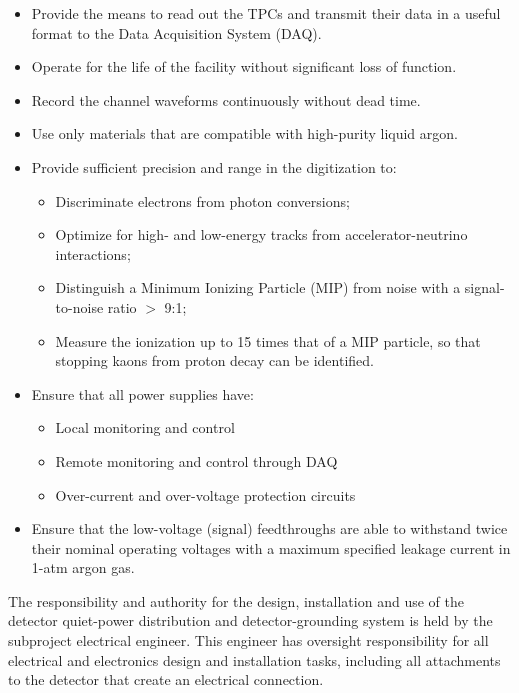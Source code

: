 \begin{itemize}	
\item Provide the means to read out the TPCs and transmit their data in a useful format to the Data Acquisition System (DAQ).
\item Operate for the life of the facility without significant loss of function.
\item Record the channel waveforms continuously without dead time.
\item Use only materials that are compatible with high-purity liquid argon.
\item Provide sufficient precision and range in the digitization to:
\begin{itemize}
\item Discriminate electrons from photon conversions;
\item Optimize for high- and low-energy tracks from accelerator-neutrino interactions;
\item Distinguish a Minimum Ionizing Particle (MIP) from noise with a signal-to-noise ratio $>$ 9:1;
\item Measure the ionization up to 15 times that of a MIP particle, so that stopping kaons from proton decay can be identified.
\end{itemize}
\item Ensure that all power supplies have: 
\begin{itemize}
\item Local monitoring and control
\item Remote monitoring and control through DAQ
\item Over-current and over-voltage protection circuits
\end{itemize}
\item Ensure that the low-voltage (signal) feedthroughs are able to withstand twice their nominal operating voltages 
with a maximum specified leakage current in 1-atm argon gas.
\end{itemize}

The responsibility and authority for the design, installation 
and use of the detector quiet-power distribution and 
detector-grounding system is held by the subproject electrical engineer. 
This engineer has oversight responsibility for all electrical and electronics 
design and installation tasks, including all attachments to the detector 
that create an electrical connection. 

